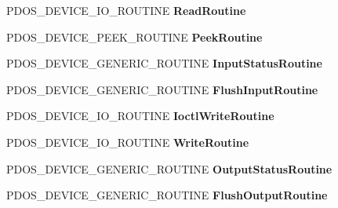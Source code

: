 \begin{DoxyCompactItemize}
P\+D\+O\+S\+\_\+\+D\+E\+V\+I\+C\+E\+\_\+\+I\+O\+\_\+\+R\+O\+U\+T\+I\+NE {\bfseries Read\+Routine}
\item 
\mbox{\label{struct___d_o_s___d_e_v_i_c_e___n_o_d_e_a1552a563da145af266a0040699b3f2a8}} 
P\+D\+O\+S\+\_\+\+D\+E\+V\+I\+C\+E\+\_\+\+P\+E\+E\+K\+\_\+\+R\+O\+U\+T\+I\+NE {\bfseries Peek\+Routine}
\item 
\mbox{\label{struct___d_o_s___d_e_v_i_c_e___n_o_d_e_ac14c16715597b5e032c2e5a3706a2f08}} 
P\+D\+O\+S\+\_\+\+D\+E\+V\+I\+C\+E\+\_\+\+G\+E\+N\+E\+R\+I\+C\+\_\+\+R\+O\+U\+T\+I\+NE {\bfseries Input\+Status\+Routine}
\item 
\mbox{\label{struct___d_o_s___d_e_v_i_c_e___n_o_d_e_adf1ed443747c12a3982a6d24bf87e824}} 
P\+D\+O\+S\+\_\+\+D\+E\+V\+I\+C\+E\+\_\+\+G\+E\+N\+E\+R\+I\+C\+\_\+\+R\+O\+U\+T\+I\+NE {\bfseries Flush\+Input\+Routine}
\item 
\mbox{\label{struct___d_o_s___d_e_v_i_c_e___n_o_d_e_a6d6e19df831e8f979eaa29017bb04a61}} 
P\+D\+O\+S\+\_\+\+D\+E\+V\+I\+C\+E\+\_\+\+I\+O\+\_\+\+R\+O\+U\+T\+I\+NE {\bfseries Ioctl\+Write\+Routine}
\item 
\mbox{\label{struct___d_o_s___d_e_v_i_c_e___n_o_d_e_a46df2ec298736506be0b68fd687226d3}} 
P\+D\+O\+S\+\_\+\+D\+E\+V\+I\+C\+E\+\_\+\+I\+O\+\_\+\+R\+O\+U\+T\+I\+NE {\bfseries Write\+Routine}
\item 
\mbox{\label{struct___d_o_s___d_e_v_i_c_e___n_o_d_e_ab9c801769c679441d9118fecfcf90ee0}} 
P\+D\+O\+S\+\_\+\+D\+E\+V\+I\+C\+E\+\_\+\+G\+E\+N\+E\+R\+I\+C\+\_\+\+R\+O\+U\+T\+I\+NE {\bfseries Output\+Status\+Routine}
\item 
\mbox{\label{struct___d_o_s___d_e_v_i_c_e___n_o_d_e_ac5ad14e14a819d4430c61b3f9214a01d}} 
P\+D\+O\+S\+\_\+\+D\+E\+V\+I\+C\+E\+\_\+\+G\+E\+N\+E\+R\+I\+C\+\_\+\+R\+O\+U\+T\+I\+NE {\bfseries Flush\+Output\+Routine}
\item 
\mbox{\label{struct___d_o_s___d_e_v_i_c_e___n_o_d_e_a2abff6f599ee05a6868f9d65df8464c5}} 

\end{DoxyCompactItemize}
